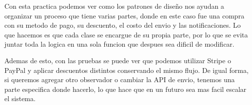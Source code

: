 \documentclass[letterpaper,11pt]{article}
\begin{document}
Con esta practica podemos ver como los patrones de diseño nos ayudan a organizar un proceso que tiene varias partes, donde en este caso fue una compra con su metodo de pago, su descuento, el costo del envio y las notificaciones. Lo que hacemos es que cada clase se encargue de su propia parte, por lo que se evita juntar toda la logica en una sola funcion que despues sea dificil de modificar.

Ademas de esto, con las pruebas se puede ver que podemos utilizar Stripe o PayPal y aplicar descuentos distintos conservando el mismo flujo. De igual forma, si queremos agregar otro observador o cambiar la API de envio, tenemos una parte especifica donde hacerlo, lo que hace que en un futuro sea mas facil escalar el sistema.
\end{document}
